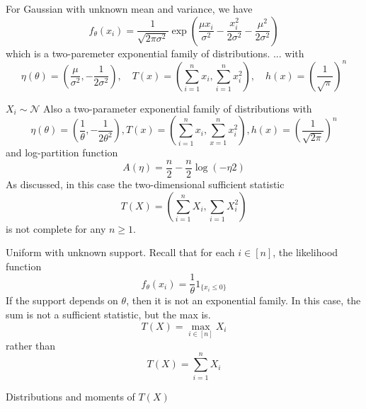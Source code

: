 \begin{exmp}
    For Gaussian with unknown mean and variance, we have
    \[
        f_\theta(x_i) = \frac{1}{\sqrt{2\pi\sigma^2}} \exp \left( \frac{\mu x_i}{\sigma^2} - \frac{x_i^2}{2\sigma^2} - \frac{\mu^2}{2\sigma^2} \right)
    \]
    which is a two-paremeter exponential family of distributions.
    ...
    with
    \[
        \eta(\theta) = \left(\frac{\mu}{\sigma^2},  -\frac{1}{2\sigma^2} \right), \quad T(x) = \left(\sum_{i=1}^n x_i, \sum_{i=1}^n x_i^2 \right), \quad h(x) = \left( \frac{1}{\sqrt{\pi}}\right)^n
    \]

\end{exmp}


\begin{exmp}
    $X_i \sim \mathcal{N}$
    Also a two-parameter exponential family of distributions with
    \[
        \eta(\theta) = \left( \frac{1}{\theta}, -\frac{1}{2\theta^2} \right), T(x) = \left( \sum_{i=1}^n x_i, \sum_{x=1}^n x_i^2 \right), h(x) = \left( \frac{1}{\sqrt{2\pi}}\right)^n
    \]
    and log-partition function
    \[
        A(\eta) = \frac{n}{2} - \frac{n}{2} \log(-\eta 2)
    \]
    As discussed, in this case the two-dimensional sufficient statistic
    \[
        T(X) = \left( \sum_{i=1}^n X_i, \sum_{i=1} X_i^2 \right)
    \]
    is not complete for any $n \geq 1$.

\end{exmp}

\begin{exmp}
    Uniform with unknown support. Recall that for each $i \in [n]$, the likelihood function
    \[
        f_\theta(x_i) = \frac{1}{\theta} 1_{\{x_i \leq 0\}}
    \]
    If the support depends on $\theta$, then it is not an exponential family. In this case, the sum is not a sufficient statistic, but the max is.
    \[
        T(X) = \max_{i \in [n]} X_i
    \]
    rather than
    \[
        T(X) = \sum_{i=1}^n X_i
    \]
\end{exmp}
\noindent Distributions and moments of $T(X)$